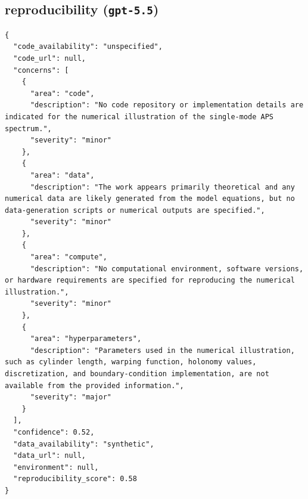\documentclass[11pt]{article}
\begin{document}
\subsection*{reproducibility (\texttt{gpt-5.5})}
\begin{verbatim}
{
  "code_availability": "unspecified",
  "code_url": null,
  "concerns": [
    {
      "area": "code",
      "description": "No code repository or implementation details are indicated for the numerical illustration of the single-mode APS spectrum.",
      "severity": "minor"
    },
    {
      "area": "data",
      "description": "The work appears primarily theoretical and any numerical data are likely generated from the model equations, but no data-generation scripts or numerical outputs are specified.",
      "severity": "minor"
    },
    {
      "area": "compute",
      "description": "No computational environment, software versions, or hardware requirements are specified for reproducing the numerical illustration.",
      "severity": "minor"
    },
    {
      "area": "hyperparameters",
      "description": "Parameters used in the numerical illustration, such as cylinder length, warping function, holonomy values, discretization, and boundary-condition implementation, are not available from the provided information.",
      "severity": "major"
    }
  ],
  "confidence": 0.52,
  "data_availability": "synthetic",
  "data_url": null,
  "environment": null,
  "reproducibility_score": 0.58
}
\end{verbatim}
\end{document}
